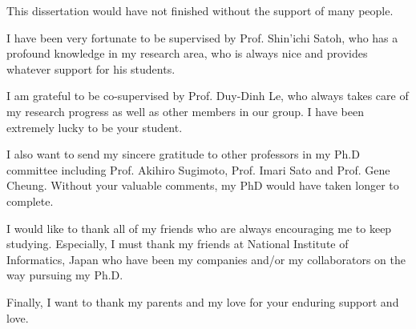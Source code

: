 
\begin{acknowledgements}      


This dissertation would have not finished without the support of many people.

I have been very fortunate to be supervised by Prof. Shin'ichi Satoh, who has a profound knowledge in my research area, who is always nice and provides whatever support for his students.

I am grateful to be co-supervised by Prof. Duy-Dinh Le, who always takes care of my research progress as well as other members in our group. I have been extremely lucky to be your student.     

I also want to send my sincere gratitude to other professors in my Ph.D committee including Prof. Akihiro Sugimoto, Prof. Imari Sato and Prof. Gene Cheung. Without your valuable comments, my PhD would have taken longer to complete. 

I would like to thank all of my friends who are always encouraging me to keep studying. Especially, I must thank my friends at National Institute of Informatics, Japan who have been my companies and/or my collaborators on the way pursuing my Ph.D.  

Finally, I want to thank my parents and my love for your enduring support and love. 

\end{acknowledgements}
